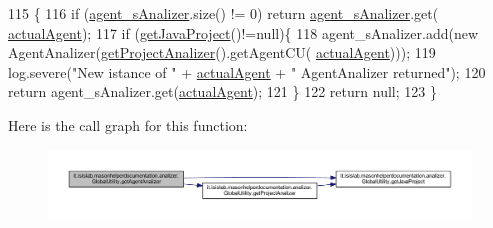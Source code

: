 \begin{DoxyCode}
115                                                    \{
116         \textcolor{keywordflow}{if} (\hyperlink{classit_1_1isislab_1_1masonhelperdocumentation_1_1analizer_1_1_global_utility_a82af8b91f98c70ad25d504cc16e424b9}{agent\_sAnalizer}.size() != 0) \textcolor{keywordflow}{return} \hyperlink{classit_1_1isislab_1_1masonhelperdocumentation_1_1analizer_1_1_global_utility_a82af8b91f98c70ad25d504cc16e424b9}{agent\_sAnalizer}.get(
      \hyperlink{classit_1_1isislab_1_1masonhelperdocumentation_1_1analizer_1_1_global_utility_a8106b6699b9c7834ead4fc38d62a2575}{actualAgent});
117         \textcolor{keywordflow}{if} (\hyperlink{classit_1_1isislab_1_1masonhelperdocumentation_1_1analizer_1_1_global_utility_a1ce214dc72551ff78133933c461d4e59}{getJavaProject}()!=null)\{
118             agent\_sAnalizer.add(\textcolor{keyword}{new} AgentAnalizer(\hyperlink{classit_1_1isislab_1_1masonhelperdocumentation_1_1analizer_1_1_global_utility_af6bcca0c06ec6fa8c2b2b88f5050914c}{getProjectAnalizer}().getAgentCU(
      \hyperlink{classit_1_1isislab_1_1masonhelperdocumentation_1_1analizer_1_1_global_utility_a8106b6699b9c7834ead4fc38d62a2575}{actualAgent})));
119             log.severe(\textcolor{stringliteral}{"New istance of "} + \hyperlink{classit_1_1isislab_1_1masonhelperdocumentation_1_1analizer_1_1_global_utility_a8106b6699b9c7834ead4fc38d62a2575}{actualAgent} + \textcolor{stringliteral}{" AgentAnalizer returned"});
120             \textcolor{keywordflow}{return} agent\_sAnalizer.get(\hyperlink{classit_1_1isislab_1_1masonhelperdocumentation_1_1analizer_1_1_global_utility_a8106b6699b9c7834ead4fc38d62a2575}{actualAgent});
121         \}
122         \textcolor{keywordflow}{return} null;
123     \}
\end{DoxyCode}


Here is the call graph for this function\-:\nopagebreak
\begin{figure}[H]
\begin{center}
\leavevmode
\includegraphics[width=350pt]{classit_1_1isislab_1_1masonhelperdocumentation_1_1analizer_1_1_global_utility_a0853970ee6f3d2b617fc1dd5fcd172ce_cgraph}
\end{center}
\end{figure}





